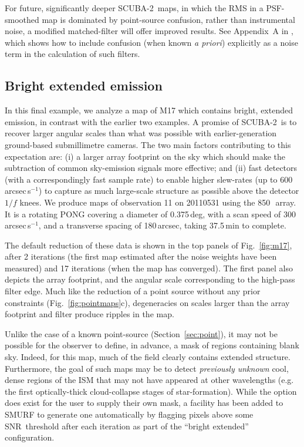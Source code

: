 \documentclass[useAMS,usenatbib,nofootinbib]{mn2e}
\newcommand{\snr}{SNR}
\newcommand{\scuba}{SCUBA-2}
\begin{document}
For future, significantly deeper \scuba\ maps, in which the RMS in a
PSF-smoothed map is dominated by point-source confusion, rather than
instrumental noise, a modified matched-filter will offer improved
results. See Appendix~A in \citet{chapin2011}, which shows how to
include confusion (when known \emph{a priori}) explicitly as a noise
term in the calculation of such filters.

\subsection{Bright extended emission}
\label{sec:extended}

In this final example, we analyze a map of M17 which contains bright,
extended emission, in contrast with the earlier two examples. A
promise of \scuba\ is to recover larger angular scales than what was
possible with earlier-generation ground-based submillimetre
cameras. The two main factors contributing to this expectation are:
(i) a larger array footprint on the sky which should make the
subtraction of common sky-emission signals more effective; and (ii)
fast detectors (with a correspondingly fast sample rate) to enable
higher slew-rates (up to 600\,arcsec\,s$^{-1}$) to capture as much
large-scale structure as possible above the detector $1/f$ knees. We
produce maps of observation 11 on 20110531 using the 850\,\micron\
array. It is a rotating PONG covering a diameter of 0.375\,deg, with a
scan speed of 300\,arcsec\,s$^{-1}$, and a transverse spacing of
180\,arcsec, taking 37.5\,min to complete.

The default reduction of these data is shown in the top panels of
Fig.~\ref{fig:m17}, after 2 iterations (the first map estimated after
the noise weights have been measured) and 17 iterations (when the map
has converged). The first panel also depicts the array footprint, and
the angular scale corresponding to the high-pass filter edge. Much
like the reduction of a point source without any prior constraints
(Fig.~\ref{fig:pointmaps}c), degeneracies on scales larger than the
array footprint and filter produce ripples in the map.

Unlike the case of a known point-source (Section~\ref{sec:point}), it
may not be possible for the observer to define, in advance, a mask of
regions containing blank sky. Indeed, for this map, much of the field
clearly contains extended structure. Furthermore, the goal of such
maps may be to detect \emph{previously unknown} cool, dense regions of
the ISM that may not have appeared at other wavelengths (e.g. the
first optically-thick cloud-collapse stages of star-formation). While
the option does exist for the user to supply their own mask, a
facility has been added to SMURF to generate one automatically by
flagging pixels above some \snr\ threshold after each iteration as part
of the ``bright extended'' configuration.
\end{document}
